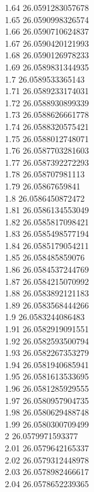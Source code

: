 {1.64	26.0591283057678\\
1.65	26.0590998326574\\
1.66	26.0590710624837\\
1.67	26.0590420121993\\
1.68	26.0590126978233\\
1.69	26.0589831344935\\
1.7	26.0589533365143\\
1.71	26.0589233174031\\
1.72	26.0588930899339\\
1.73	26.0588626661778\\
1.74	26.0588320575421\\
1.75	26.0588012748071\\
1.76	26.0587703281603\\
1.77	26.0587392272293\\
1.78	26.058707981113\\
1.79	26.05867659841\\
1.8	26.0586450872472\\
1.81	26.0586134553049\\
1.82	26.0585817098421\\
1.83	26.0585498577194\\
1.84	26.0585179054211\\
1.85	26.058485859076\\
1.86	26.0584537244769\\
1.87	26.0584215070992\\
1.88	26.0583892121183\\
1.89	26.0583568444266\\
1.9	26.0583244086483\\
1.91	26.0582919091551\\
1.92	26.0582593500794\\
1.93	26.0582267353279\\
1.94	26.0581940685941\\
1.95	26.0581613533695\\
1.96	26.0581285929555\\
1.97	26.0580957904735\\
1.98	26.0580629488748\\
1.99	26.0580300709499\\
2	26.0579971593377\\
2.01	26.0579642165337\\
2.02	26.0579312448978\\
2.03	26.0578982466617\\
2.04	26.0578652239365\\
}
